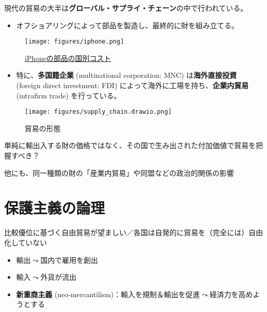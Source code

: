 \documentclass[
  xelatex,
  ja=standard]{bxjsarticle}
\providecommand{\tightlist}{%
  \setlength{\itemsep}{0pt}\setlength{\parskip}{0pt}}\usepackage{longtable,booktabs,array}
\begin{document}
現代の貿易の大半は\textbf{グローバル・サプライ・チェーン}の中で行われている。

\begin{itemize}
\tightlist
\item
  オフショアリングによって部品を製造し、最終的に財を組み立てる。
\end{itemize}

\begin{figure}[htpb]

{\centering \texttt{[image: figures/iphone.png]}

}

\caption{\href{https://asia.nikkei.com/Business/Technology/iPhone-14-teardown-reveals-parts-20-costlier-than-previous-model}{iPhoneの部品の国別コスト}}

\end{figure}

\begin{itemize}
\tightlist
\item
  特に、\textbf{多国籍企業} (multinational corporation: MNC)
  は\textbf{海外直接投資} (foreign direct investment: FDI)
  によって海外に工場を持ち、\textbf{企業内貿易} (intrafirm trade)
  を行っている。
\end{itemize}

\begin{figure}[htpb]

{\centering \texttt{[image: figures/supply\_chain.drawio.png]}

}

\caption{貿易の形態\citep{inomata2019}}

\end{figure}

単純に輸出入する財の価格ではなく、その国で生み出された付加価値で貿易を把握すべき？\citep{inomata2019}

他にも、同一種類の財の「産業内貿易」や同盟などの政治的関係の影響

\hypertarget{ux4fddux8b77ux4e3bux7fa9ux306eux8ad6ux7406}{%
\section{保護主義の論理}\label{ux4fddux8b77ux4e3bux7fa9ux306eux8ad6ux7406}}

比較優位に基づく自由貿易が望ましい／各国は自発的に貿易を（完全には）自由化していない

\begin{itemize}
\tightlist
\item
  輸出\(\leadsto\)国内で雇用を創出
\item
  輸入\(\leadsto\)外貨が流出
\item
  \textbf{新重商主義}
  (neo-mercantilism)：輸入を規制＆輸出を促進\(\leadsto\)経済力を高めようとする
\end{itemize}
\end{document}
